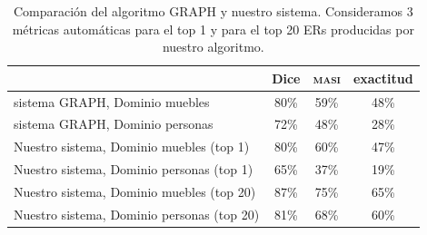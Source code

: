 \begin{table}[H]
\begin{table}[H]
\begin{center}
\begin{tabular}{|l|c|c|c|}
\hline
	 	& 	Dice		&	\textsc{masi}	&	exactitud		\\
\hline
sistema GRAPH, Dominio muebles	& 	80\% 		&	59\%	&	48\%		 	\\
sistema GRAPH, Dominio personas 	& 	72\%		&	48\%	&	28\%			\\
\hline
Nuestro sistema, Dominio muebles (top 1)	&	80\%		&	60\%	&	47\%		\\
Nuestro sistema, Dominio personas (top 1)	&	65\%		&	37\%	&	19\%		\\
\hline
Nuestro sistema, Dominio muebles (top 20)&	87\%		&	75\%  	&	65\%		\\
Nuestro sistema, Dominio personas (top 20)   &	81\%		&68\%	&	60\%		\\
\hline
\end{tabular}
\caption{Comparaci\'on del algoritmo GRAPH y nuestro sistema. Consideramos 3 m\'etricas autom\'aticas para el top 1 y para el top 20 ERs producidas por nuestro algoritmo.}
\label{Tabla_sis_1_20}
\end{center}
\end{table}



\end{table}
